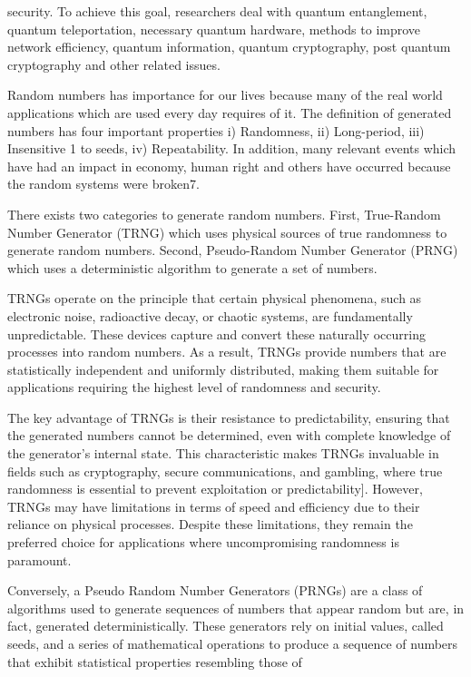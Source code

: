 \documentclass[12pt]{article}
\begin{document}
{	security. To achieve this goal, researchers deal with quantum entanglement, quantum teleportation, necessary quantum hardware,
	methods to improve network efficiency, quantum information, quantum cryptography, post quantum cryptography and other
	related issues.\par
	Random numbers has importance for our lives because many of the real world applications which are used every day\cite{a7}
	requires of it. The definition of generated numbers has four important properties i) Randomness, ii) Long-period, iii) Insensitive 1
	to seeds, iv) Repeatability. In addition, many relevant events which have had an impact in economy, human right and others\cite{a8,a9}
	have occurred because the random systems were broken7.\par
	There exists two categories to generate random numbers. First, True-Random Number Generator (TRNG) which uses
	physical sources of true randomness to generate random numbers. Second, Pseudo-Random Number Generator (PRNG) which
	uses a deterministic algorithm to generate a set of numbers.\par
	TRNGs operate on the principle that certain physical phenomena, such as electronic noise, radioactive decay, or chaotic
	systems, are fundamentally unpredictable. These devices capture and convert these naturally occurring processes into random \cite{a10,a11}
	numbers. As a result, TRNGs provide numbers that are statistically independent and uniformly distributed, making them
	suitable for applications requiring the highest level of randomness and security.\par
	The key advantage of TRNGs is their resistance to predictability, ensuring that the generated numbers cannot be determined,
	even with complete knowledge of the generator’s internal state. This characteristic makes TRNGs invaluable in fields such as
	cryptography, secure communications, and gambling, where true randomness is essential to prevent exploitation or predictability\cite{a12,a13,a14}].
	However, TRNGs may have limitations in terms of speed and efficiency due to their reliance on physical processes. Despite
	these limitations, they remain the preferred choice for applications where uncompromising randomness is paramount.\par
	Conversely, a Pseudo Random Number Generators (PRNGs) are a class of algorithms used to generate sequences of
	numbers that appear random but are, in fact, generated deterministically. These generators rely on initial values, called seeds\cite{a15},
	and a series of mathematical operations to produce a sequence of numbers that exhibit statistical properties resembling those of
}
\end{document}
